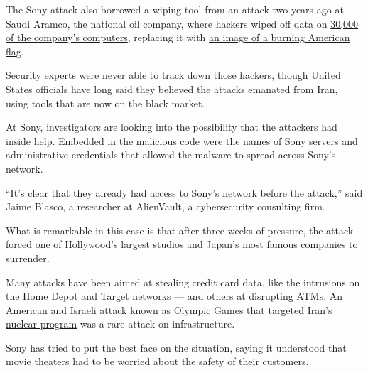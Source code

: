 The Sony attack also borrowed a wiping tool from an attack two years ago
at Saudi Aramco, the national oil company, where hackers wiped off data
on
\href{http://bits.blogs.nytimes3xbfgragh.onion/2012/08/23/hackers-lay-claim-to-saudi-aramco-cyberattack/?module=Search\&mabReward=relbias\%3Ar\%2C\%7B\%221\%22\%3A\%22RI\%3A8\%22\%7D}{30,000
of the company's computers}, replacing it with
\href{http://bits.blogs.nytimes3xbfgragh.onion/2012/08/27/connecting-the-dots-after-cyberattack-on-saudi-aramco/?module=Search\&mabReward=relbias\%3Ar\%2C\%7B\%221\%22\%3A\%22RI\%3A8\%22\%7D}{an
image of a burning American flag}.

Security experts were never able to track down those hackers, though
United States officials have long said they believed the attacks
emanated from Iran, using tools that are now on the black market.

At Sony, investigators are looking into the possibility that the
attackers had inside help. Embedded in the malicious code were the names
of Sony servers and administrative credentials that allowed the malware
to spread across Sony's network.

``It's clear that they already had access to Sony's network before the
attack,'' said Jaime Blasco, a researcher at AlienVault, a cybersecurity
consulting firm.

What is remarkable in this case is that after three weeks of pressure,
the attack forced one of Hollywood's largest studios and Japan's most
famous companies to surrender.

Many attacks have been aimed at stealing credit card data, like the
intrusions on the
\href{http://bits.blogs.nytimes3xbfgragh.onion/2014/09/08/home-depot-confirms-that-it-was-hacked/?module=Search\&mabReward=relbias\%3Ar\%2C\%7B\%221\%22\%3A\%22RI\%3A8\%22\%7D}{Home
Depot} and
\href{http://www.nytimes3xbfgragh.onion/2014/03/14/business/target-missed-signs-of-a-data-breach.html?module=Search\&mabReward=relbias\%3As\%2C\%7B\%221\%22\%3A\%22RI\%3A8\%22\%7D}{Target}
networks --- and others at disrupting ATMs. An American and Israeli
attack known as Olympic Games that
\href{http://www.nytimes3xbfgragh.onion/2012/06/01/world/middleeast/obama-ordered-wave-of-cyberattacks-against-iran.html?pagewanted=all\&module=Search\&mabReward=relbias\%3Aw\%2C\%7B\%221\%22\%3A\%22RI\%3A8\%22\%7D}{targeted
Iran's nuclear program} was a rare attack on infrastructure.

Sony has tried to put the best face on the situation, saying it
understood that movie theaters had to be worried about the safety of
their customers.

